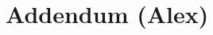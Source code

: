 \documentclass{bmcart}
\begin{document}
\listoftodos[Notes]



\section*{Addendum (Alex)}

%
\end{document}
